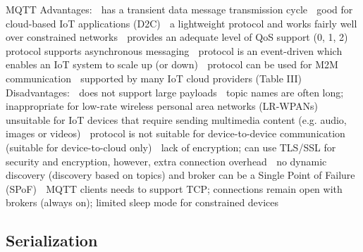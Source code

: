MQTT
Advantages:
 has a transient data message transmission cycle
 good for cloud-based IoT applications (D2C)
 a lightweight protocol and works fairly well over
constrained networks
 provides an adequate level of QoS support (0, 1, 2)
 protocol supports asynchronous messaging
 protocol is an event-driven which enables an IoT
system to scale up (or down)
 protocol can be used for M2M communication
 supported by many IoT cloud providers (Table III)
Disadvantages:
 does not support large payloads
 topic names are often long; inappropriate for low-rate
wireless personal area networks (LR-WPANs)
 unsuitable for IoT devices that require sending
multimedia content (e.g. audio, images or videos)
 protocol is not suitable for device-to-device
communication (suitable for device-to-cloud only)
 lack of encryption; can use TLS/SSL for security and
encryption, however, extra connection overhead
 no dynamic discovery (discovery based on topics)
and broker can be a Single Point of Failure (SPoF)
 MQTT clients needs to support TCP; connections
remain open with brokers (always on); limited sleep
mode for constrained devices
\cite[27]{protocols}

\subsection{Serialization}



